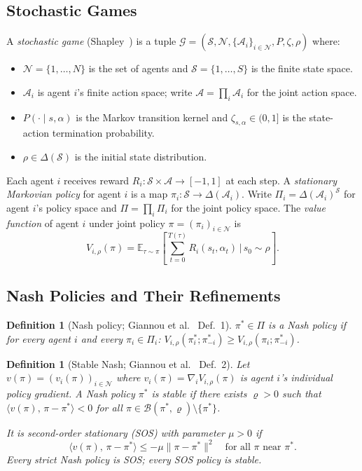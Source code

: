 \documentclass{article}
\newtheorem{definition}[theorem]{Definition}
\newcommand{\E}{\mathbb{E}}
\newcommand{\calS}{\mathcal{S}}
\newcommand{\calN}{\mathcal{N}}
\newcommand{\calA}{\mathcal{A}}
\newcommand{\calB}{\mathcal{B}}
\newcommand{\calG}{\mathcal{G}}
\newcommand{\ip}[2]{\langle #1,\, #2 \rangle}
\newcommand{\norm}[1]{\| #1 \|}
\begin{document}
\subsection{Stochastic Games}
\label{sec:sg}

A \emph{stochastic game} (Shapley~\cite{shapley1953}) is a tuple
$\calG = (\calS, \calN, \{\calA_i\}_{i \in \calN}, P, \zeta, \rho)$
where:
\begin{itemize}
\item $\calN = \{1, \ldots, N\}$ is the set of agents and
  $\calS = \{1, \ldots, S\}$ is the finite state space.
\item $\calA_i$ is agent $i$'s finite action space; write
  $\calA = \prod_i \calA_i$ for the joint action space.
\item $P(\cdot \mid s, \alpha)$ is the Markov transition kernel and
  $\zeta_{s,\alpha} \in (0,1]$ is the state-action termination
  probability.
\item $\rho \in \Delta(\calS)$ is the initial state distribution.
\end{itemize}
Each agent $i$ receives reward $R_i : \calS \times \calA \to [-1,1]$
at each step. A \emph{stationary Markovian policy} for agent $i$
is a map $\pi_i : \calS \to \Delta(\calA_i)$. Write
$\Pi_i = \Delta(\calA_i)^{\calS}$ for agent $i$'s policy space and
$\Pi = \prod_i \Pi_i$ for the joint policy space. The
\emph{value function} of agent $i$ under joint policy
$\pi = (\pi_i)_{i \in \calN}$ is
\begin{equation}
  \label{eq:value}
  V_{i,\rho}(\pi) = \E_{\tau \sim \pi}\!\left[
    \sum_{t=0}^{T(\tau)} R_i(s_t, \alpha_t) \,\Big|\, s_0 \sim \rho
  \right].
\end{equation}

\subsection{Nash Policies and Their Refinements}
\label{sec:nash}

\begin{definition}[Nash policy; Giannou et al.~\cite{giannou2022} Def.~1]
$\pi^* \in \Pi$ is a \emph{Nash policy} if for every agent $i$ and
every $\pi_i \in \Pi_i$:
$V_{i,\rho}(\pi_i^*;\pi_{-i}^*) \ge V_{i,\rho}(\pi_i;\pi_{-i}^*)$.
\end{definition}

\begin{definition}[Stable Nash; Giannou et al.~\cite{giannou2022} Def.~2]
Let $v(\pi) = (v_i(\pi))_{i \in \calN}$ where
$v_i(\pi) = \nabla_i V_{i,\rho}(\pi)$ is agent $i$'s individual policy
gradient. A Nash policy $\pi^*$ is \emph{stable} if there exists
$\varrho > 0$ such that
$\ip{v(\pi)}{\pi - \pi^*} < 0$ for all
$\pi \in \calB(\pi^*, \varrho) \setminus \{\pi^*\}$.

It is \emph{second-order stationary (SOS)} with parameter $\mu > 0$ if
\begin{equation}
  \label{eq:sos}
  \ip{v(\pi)}{\pi - \pi^*} \le -\mu\norm{\pi - \pi^*}^2
  \quad \text{for all } \pi \text{ near } \pi^*.
\end{equation}
Every strict Nash policy is SOS; every SOS policy is stable.
\end{definition}
\end{document}
